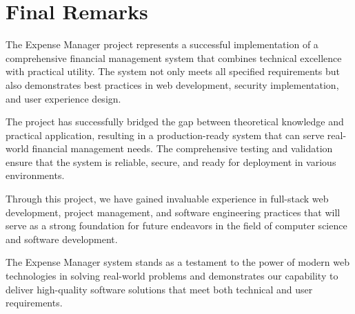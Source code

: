 \section{Final Remarks}

The Expense Manager project represents a successful implementation of a comprehensive financial management system that combines technical excellence with practical utility. The system not only meets all specified requirements but also demonstrates best practices in web development, security implementation, and user experience design.

The project has successfully bridged the gap between theoretical knowledge and practical application, resulting in a production-ready system that can serve real-world financial management needs. The comprehensive testing and validation ensure that the system is reliable, secure, and ready for deployment in various environments.

Through this project, we have gained invaluable experience in full-stack web development, project management, and software engineering practices that will serve as a strong foundation for future endeavors in the field of computer science and software development.

The Expense Manager system stands as a testament to the power of modern web technologies in solving real-world problems and demonstrates our capability to deliver high-quality software solutions that meet both technical and user requirements.